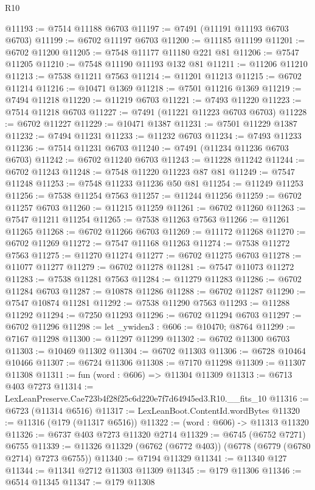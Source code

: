 \begin{lexlean}{R10}
\begin{coremodule}
@11193 := @7514 @11188 @6703
@11197 := @7491 (@11191 @11193 @6703 @6703)
@11199 := @6702 @11197 @6703
@11200 := @11185 @11199
@11201 := @6702 @11200
@11205 := @7548 @11177 @11180 @221 @81
@11206 := @7547 @11205
@11210 := @7548 @11190 @11193 @132 @81
@11211 := @11206 @11210
@11213 := @7538 @11211 @7563
@11214 := @11201 @11213
@11215 := @6702 @11214
@11216 := @10471 @1369
@11218 := @7501 @11216 @1369
@11219 := @7494 @11218
@11220 := @11219 @6703
@11221 := @7493 @11220
@11223 := @7514 @11218 @6703
@11227 := @7491 (@11221 @11223 @6703 @6703)
@11228 := @6702 @11227
@11229 := @10471 @1387
@11231 := @7501 @11229 @1387
@11232 := @7494 @11231
@11233 := @11232 @6703
@11234 := @7493 @11233
@11236 := @7514 @11231 @6703
@11240 := @7491 (@11234 @11236 @6703 @6703)
@11242 := @6702 @11240 @6703
@11243 := @11228 @11242
@11244 := @6702 @11243
@11248 := @7548 @11220 @11223 @87 @81
@11249 := @7547 @11248
@11253 := @7548 @11233 @11236 @50 @81
@11254 := @11249 @11253
@11256 := @7538 @11254 @7563
@11257 := @11244 @11256
@11259 := @6702 @11257 @6703
@11260 := @11215 @11259
@11261 := @6702 @11260
@11263 := @7547 @11211 @11254
@11265 := @7538 @11263 @7563
@11266 := @11261 @11265
@11268 := @6702 @11266 @6703
@11269 := @11172 @11268
@11270 := @6702 @11269
@11272 := @7547 @11168 @11263
@11274 := @7538 @11272 @7563
@11275 := @11270 @11274
@11277 := @6702 @11275 @6703
@11278 := @11077 @11277
@11279 := @6702 @11278
@11281 := @7547 @11073 @11272
@11283 := @7538 @11281 @7563
@11284 := @11279 @11283
@11286 := @6702 @11284 @6703
@11287 := @10878 @11286
@11288 := @6702 @11287
@11290 := @7547 @10874 @11281
@11292 := @7538 @11290 @7563
@11293 := @11288 @11292
@11294 := @7250 @11293
@11296 := @6702 @11294 @6703
@11297 := @6702 @11296
@11298 := let _ywiden3 : @606 := @10470; @8764
@11299 := @7167 @11298
@11300 := @11297 @11299
@11302 := @6702 @11300 @6703
@11303 := @10469 @11302
@11304 := @6702 @11303
@11306 := @6728 @10464 @10466
@11307 := @6724 @11306
@11308 := @7170 @11298
@11309 := @11307 @11308
@11311 := fun (word : @606) => @11304 @11309
@11313 := @6713 @403 @7273
@11314 := LexLeanPreserve.Cae723b4f28f25c6d220e7f7d64945ed3.R10.__fits_10
@11316 := @6723 (@11314 @6516)
@11317 := LexLeanBoot.ContentId.wordBytes
@11320 := @11316 (@179 (@11317 @6516))
@11322 := (word : @606) -> @11313 @11320
@11326 := @6737 @403 @7273 @11320 @2714
@11329 := @6745 (@6752 @7271) @6755
@11339 := @11326 @11329 (@6762 (@6772 @403)) (@6778 (@6779 (@6780 @2714) @7273 @6755))
@11340 := @7194 @11329
@11341 := @11340 @127
@11344 := @11341 @2712 @11303 @11309
@11345 := @179 @11306
@11346 := @6514 @11345
@11347 := @179 @11308

\end{coremodule}
\end{lexlean}
